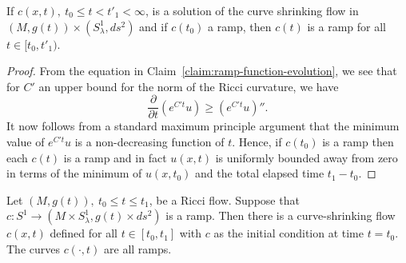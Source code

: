\begin{corollary}
\label{cor:ramp-preserved-under-flow}
\label{ubd}
If $c(x,t),\ t_0\le t< t'_1<\infty$, is a solution of the curve
shrinking flow in $( M, g(t))\times (S^1_\lambda,ds^2)$ and if
$c(t_0)$ a ramp, then $c(t)$ is a ramp for all $t\in [t_0,t'_1)$.
\end{corollary}

\begin{proof}
From  the equation in Claim~\ref{claim:ramp-function-evolution}, we see that for  $C'$ an
upper bound for the norm of the Ricci curvature, we have
$$\frac{\partial}{\partial t}\left(e^{C't}u\right)\ge \left(e^{C't}u\right)''.$$
It now follows from a standard maximum principle argument that the
minimum value of $e^{C't}u$ is a non-decreasing function of $t$.
Hence, if $c(t_0)$ is a ramp then each $c(t)$ is a ramp and in fact
$u(x,t)$ is uniformly bounded away from zero in terms of the minimum
of $u(x,t_0)$ and the total elapsed time $t_1-t_0$.
\end{proof}

\begin{lemma}
\label{lem:curve-shrinking-exists-for-ramps}
\label{csforramps}
Let $(M,g(t)),\ t_0\le t\le t_1$, be a Ricci flow. Suppose that
$c\colon S^1\to ( M\times S^1_\lambda, g(t)\times ds^2)$ is a ramp.
Then there is a curve-shrinking flow $c(x,t)$ defined for all $t\in
[t_0,t_1]$ with $c$ as the initial condition at time $t=t_0$. The
curves $c(\cdot,t)$ are all ramps.
\end{lemma}


